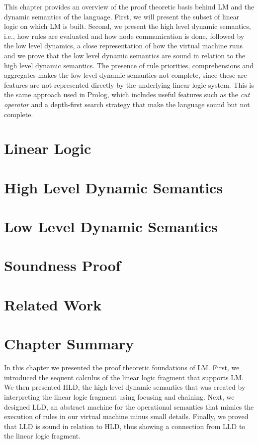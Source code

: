 This chapter provides an overview of the proof theoretic basis behind LM and the
dynamic semantics of the language. First, we will present the subset of linear
logic on which LM is built. Second, we present the high level dynamic semantics,
i.e., how rules are evaluated and how node communication is done, followed by
the low level dynamics, a close representation of how the virtual machine runs
and we prove that the low level dynamic semantics are sound in relation to the
high level dynamic semantics. The presence of rule priorities, comprehensions
and aggregates makes the low level dynamic semantics not complete, since these
are features are not represented directly by the underlying linear logic system.
This is the same approach used in Prolog, which includes useful features such as
the \emph{cut operator} and a depth-first search strategy that make the language
sound but not complete.

\section{Linear Logic}


\section{High Level Dynamic Semantics}



\section{Low Level Dynamic Semantics}

\section{Soundness Proof}

\section{Related Work}

\section{Chapter Summary}

In this chapter we presented the proof theoretic foundations of LM.  First, we
introduced the sequent calculus of the linear logic fragment that supports LM. We then
presented HLD, the high level dynamic semantics that was created by interpreting
the linear logic fragment using focusing and chaining. Next, we designed LLD,
an abstract machine for the operational semantics that mimics the execution of
rules in our virtual machine minus small details.  Finally, we proved that LLD is sound
in relation to HLD, thus showing a connection from LLD to the linear logic
fragment.

